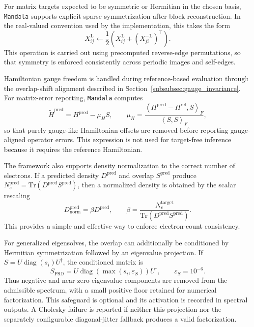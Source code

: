 \documentclass[preprint,12pt,compress,numafflabel]{elsarticle}
\newcommand{\Tr}{\mathrm{Tr}}
\begin{document}
For matrix targets expected to be symmetric or Hermitian in the chosen basis, \texttt{Mandala} supports explicit sparse symmetrization after block reconstruction.
In the real-valued convention used by the implementation, this takes the form
\begin{equation}
X_{ij}^{\bm{L}}
\leftarrow
\frac{1}{2}
\left(
X_{ij}^{\bm{L}} + \left(X_{ji}^{-\bm{L}}\right)^{\top}
\right).
\end{equation}
This operation is carried out using precomputed reverse-edge permutations, so that symmetry is enforced consistently across periodic images and self-edges.

Hamiltonian gauge freedom is handled during reference-based evaluation through the overlap-shift alignment described in Section~\ref{subsubsec:gauge_invariance}. For matrix-error reporting, \texttt{Mandala} computes
\begin{equation}
\widetilde{H}^{\mathrm{pred}}
=
H^{\mathrm{pred}} - \mu_H S,
\qquad
\mu_H
=
\frac{
\left\langle H^{\mathrm{pred}} - H^{\mathrm{ref}}, S \right\rangle_F
}{
\left\langle S, S \right\rangle_F
},
\end{equation}
so that purely gauge-like Hamiltonian offsets are removed before reporting gauge-aligned operator errors. This expression is not used for target-free inference because it requires the reference Hamiltonian.

The framework also supports density normalization to the correct number of electrons.
If a predicted density $D^{\mathrm{pred}}$ and overlap $S^{\mathrm{pred}}$ produce $N_e^{\mathrm{pred}} = \Tr(D^{\mathrm{pred}}S^{\mathrm{pred}})$, then a normalized density is obtained by the scalar rescaling
\begin{equation}
D_{\mathrm{norm}}^{\mathrm{pred}}
=
\beta D^{\mathrm{pred}},
\qquad
\beta = \frac{N_e^{\mathrm{target}}}{\Tr(D^{\mathrm{pred}}S^{\mathrm{pred}})}.
\end{equation}
This provides a simple and effective way to enforce electron-count consistency.

For generalized eigensolves, the overlap can additionally be conditioned by Hermitian symmetrization followed by an eigenvalue projection. If $S=U\operatorname{diag}(s_i)U^\dagger$, the conditioned matrix is
\begin{equation}
S_{\mathrm{PSD}}
=U\operatorname{diag}\!\left(\max(s_i,\varepsilon_S)\right)U^\dagger,
\qquad \varepsilon_S=10^{-6}.
\end{equation}
Thus negative and near-zero eigenvalue components are removed from the admissible spectrum, with a small positive floor retained for numerical factorization. This safeguard is optional and its activation is recorded in spectral outputs. A Cholesky failure is reported if neither this projection nor the separately configurable diagonal-jitter fallback produces a valid factorization.
\end{document}
